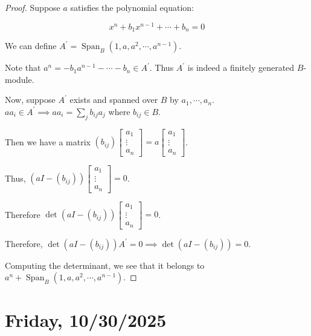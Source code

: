 \documentclass{article}
\theoremstyle{definition}
\begin{document}
    \begin{proof}
        Suppose \(a\) satisfies the polynomial equation:

        \[
            x^n + b_1 x^{n-1} + \cdots + b_n = 0
        \]

        We can define \(A^{\prime} = \operatorname{Span}_B(1, a, a^2, \cdots , a^{n-1})\).

        Note that \(a^n = -b_1 a^{n-1} - \cdots - b_n \in A^{\prime}\). Thus \(A^{\prime}\) is indeed a finitely generated \(B\)-module.
        
        Now, suppose \(A^{\prime}\) exists and spanned over \(B\) by \(a_1 , \cdots , a_n\). \(a a_i \in A^{\prime} \implies a a_i = \sum_{j} b_{ij} a_j\) where \(b_{ij} \in B\).

        Then we have a matrix \((b_{ij}) \begin{bmatrix}
            a_1 \\
            \vdots \\
            a_n
        \end{bmatrix} = a \begin{bmatrix}
            a_1 \\
            \vdots \\
            a_n
        \end{bmatrix}\).
        
        Thus, \((aI - (b_{ij})) \begin{bmatrix}
            a_1 \\
            \vdots \\
            a_n
        \end{bmatrix} = 0\).
        
        Therefore \(\det (aI - (b_{ij})) \begin{bmatrix}
            a_1 \\
            \vdots \\
            a_n
        \end{bmatrix} = 0\).
        
        Therefore, \(\det(aI - (b_{ij})) A^{\prime} = 0 \implies \det (aI - (b_{ij})) = 0\).
        
        Computing the determinant, we see that it belongs to \(a^n + \operatorname{Span}_B(1, a, a^2, \cdots , a^{n-1})\).
    \end{proof}

    \section*{Friday, 10/30/2025}
\end{document}
